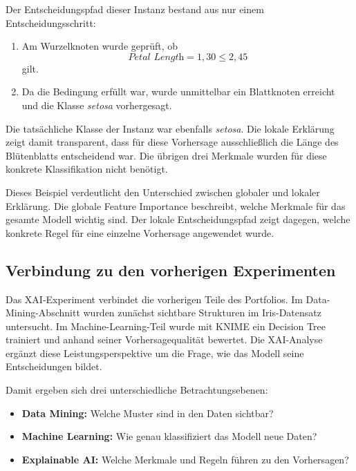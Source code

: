 \documentclass[12pt,a4paper]{article}
\begin{document}
Der Entscheidungspfad dieser Instanz bestand aus nur einem
Entscheidungsschritt:

\begin{enumerate}
    \item Am Wurzelknoten wurde geprüft, ob
    \[
    \textit{Petal Length} = 1{,}30 \leq 2{,}45
    \]
    gilt.

    \item Da die Bedingung erfüllt war, wurde unmittelbar ein
    Blattknoten erreicht und die Klasse \textit{setosa}
    vorhergesagt.
\end{enumerate}

Die tatsächliche Klasse der Instanz war ebenfalls
\textit{setosa}. Die lokale Erklärung zeigt damit transparent, dass
für diese Vorhersage ausschließlich die Länge des Blütenblatts
entscheidend war. Die übrigen drei Merkmale wurden für diese konkrete
Klassifikation nicht benötigt.

Dieses Beispiel verdeutlicht den Unterschied zwischen globaler und
lokaler Erklärung. Die globale Feature Importance beschreibt, welche
Merkmale für das gesamte Modell wichtig sind. Der lokale
Entscheidungspfad zeigt dagegen, welche konkrete Regel für eine
einzelne Vorhersage angewendet wurde.

\subsection{Verbindung zu den vorherigen Experimenten}

Das XAI-Experiment verbindet die vorherigen Teile des Portfolios.
Im Data-Mining-Abschnitt wurden zunächst sichtbare Strukturen im
Iris-Datensatz untersucht. Im Machine-Learning-Teil wurde mit KNIME
ein Decision Tree trainiert und anhand seiner Vorhersagequalität
bewertet. Die XAI-Analyse ergänzt diese Leistungsperspektive um die
Frage, wie das Modell seine Entscheidungen bildet.

Damit ergeben sich drei unterschiedliche Betrachtungsebenen:

\begin{itemize}
    \item \textbf{Data Mining:} Welche Muster sind in den Daten
    sichtbar?
    \item \textbf{Machine Learning:} Wie genau klassifiziert das
    Modell neue Daten?
    \item \textbf{Explainable AI:} Welche Merkmale und Regeln führen
    zu den Vorhersagen?
\end{itemize}
\end{document}
